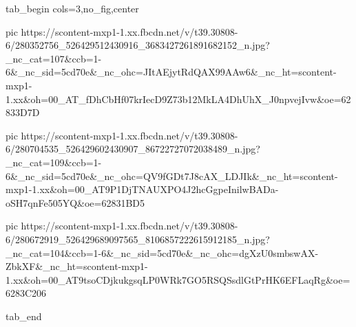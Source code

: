  
 
 
 
 

\ifcmt
  tab_begin cols=3,no_fig,center

     pic https://scontent-mxp1-1.xx.fbcdn.net/v/t39.30808-6/280352756_526429512430916_3683427261891682152_n.jpg?_nc_cat=107&ccb=1-6&_nc_sid=5cd70e&_nc_ohc=JItAEjytRdQAX99AAw6&_nc_ht=scontent-mxp1-1.xx&oh=00_AT_fDhCbHf07krIecD9Z73b12MkLA4DhUhX_J0npvejIvw&oe=62833D7D

     pic https://scontent-mxp1-1.xx.fbcdn.net/v/t39.30808-6/280704535_526429602430907_86722727072038489_n.jpg?_nc_cat=109&ccb=1-6&_nc_sid=5cd70e&_nc_ohc=QV9fGDt7J8cAX_LDJIk&_nc_ht=scontent-mxp1-1.xx&oh=00_AT9P1DjTNAUXPO4J2hcGgpeInilwBADa-oSH7qnFe505YQ&oe=62831BD5

     pic https://scontent-mxp1-1.xx.fbcdn.net/v/t39.30808-6/280672919_526429689097565_8106857222615912185_n.jpg?_nc_cat=104&ccb=1-6&_nc_sid=5cd70e&_nc_ohc=dgXzU0smbswAX-ZbkXF&_nc_ht=scontent-mxp1-1.xx&oh=00_AT9tsoCDjkukgsqLP0WRk7GO5RSQSsdlGtPrHK6EFLaqRg&oe=6283C206

  tab_end
\fi
